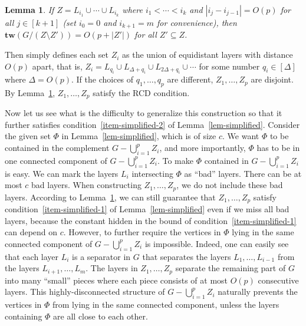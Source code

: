 \documentclass[a4paper,11pt]{article}
\newtheorem{lemma}{Lemma}
\numberwithin{lemma}{section}
\newcommand{\tw}{\mathbf{tw}}
\begin{document}
\begin{lemma}\label{lem-equi}
 If $Z = L_{i_1} \cup \cdots \cup L_{i_k}$ where $i_1 < \cdots < i_k$ and $|i_j - i_{j-1}| = O(p)$ for all $j \in [k+1]$ (set $i_0 = 0$ and $i_{k+1} = m$ for convenience), then $\tw(G/(Z \setminus Z')) = O(p+|Z'|)$ for all $Z' \subseteq Z$.
\end{lemma}

Then \cite{BandyapadhyayLLSJ22} simply defines each set $Z_i$ as the union of equidistant layers with distance $O(p)$ apart, that is, $Z_i = L_{q_i} \cup L_{\Delta+q_i} \cup L_{2 \Delta + q_i} \cup \cdots$ for some number $q_i \in [\Delta]$ where $\Delta = O(p)$.
If the choices of $q_1,\dots,q_p$ are different, $Z_1,\dots,Z_p$ are disjoint.
By Lemma~\ref{lem-equi}, $Z_1,\dots,Z_p$ satisfy the RCD condition.

Now let us see what is the difficulty to generalize this construction so that it further satisfies condition~\ref{item-simplified-2} of Lemma~\ref{lem-simplified}.
Consider the given set $\varPhi$ in Lemma~\ref{lem-simplified}, which is of size $c$.
We want $\varPhi$ to be contained in the complement $G-\bigcup_{i=1}^{p} Z_i$, and more importantly, $\varPhi$ has to be in one connected component of $G-\bigcup_{i=1}^{p} Z_i$.
To make $\varPhi$ contained in $G-\bigcup_{i=1}^{p} Z_i$ is easy.
We can mark the layers $L_i$ intersecting $\varPhi$ as ``bad'' layers.
There can be at most $c$ bad layers.
When constructing $Z_1,\dots,Z_p$, we do not include these bad layers.
According to Lemma~\ref{lem-equi}, we can still guarantee that $Z_1,\dots,Z_p$ satisfy condition~\ref{item-simplified-1} of Lemma~\ref{lem-simplified} even if we miss all bad layers, because the constant hidden in the bound of condition~\ref{item-simplified-1} can depend on $c$.
However, to further require the vertices in $\varPhi$ lying in the same connected component of $G-\bigcup_{i=1}^{p} Z_i$ is impossible.
Indeed, one can easily see that each layer $L_i$ is a separator in $G$ that separates the layers $L_1,\dots,L_{i-1}$ from the layers $L_{i+1},\dots,L_m$.
The layers in $Z_1,\dots,Z_p$ separate the remaining part of $G$ into many ``small'' pieces where each piece consists of at most $O(p)$ consecutive layers.
This highly-disconnected structure of $G-\bigcup_{i=1}^{p} Z_i$ naturally prevents the vertices in $\varPhi$ from lying in the same connected component, unless the layers containing $\varPhi$ are all close to each other.
\end{document}
